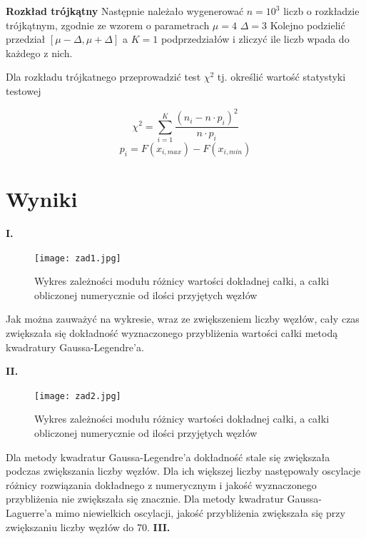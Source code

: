 \documentclass{article}
\begin{document}
\setlength{\parindent}{0pt}
\textbf{Rozkład trójkątny}
Następnie należało wygenerować $n= 10^3$
liczb o rozkładzie trójkątnym, zgodnie ze wzorem 
o parametrach $\mu=4$ $\Delta=3$
\newline
Kolejno podzielić przedział $[\mu-\Delta, \mu+\Delta]$ a $K=1$ podprzedziałów i zliczyć ile liczb wpada do każdego z nich.

\newline

Dla rozkładu trójkatnego przeprowadzić test $\chi^
2$ tj. określić wartość statystyki testowej

\begin{equation}
    \chi^2=\sum_{i=1}^K \frac{(n_i-n\cdot p_i)^2}{n\cdot p_i}
\end{equation}
\begin{equation}
    p_i=F(x_{i,max})-F(x_{i,min})
\end{equation}

\newline

\section{Wyniki}
\textbf{I.}

\begin{figure}[H]
\begin{center}
\texttt{[image: zad1.jpg]}
\caption{Wykres zależności modułu różnicy wartości dokładnej całki, a całki obliczonej numerycznie od ilości przyjętych
węzłów}
\label{pierwszy} 
\end{center}
\end{figure}

Jak można zauważyć na wykresie, wraz ze zwiększeniem liczby węzłów, cały czas
zwiększała się dokładność wyznaczonego przybliżenia wartości całki metodą
kwadratury Gaussa-Legendre’a.

\newpage
\textbf{II.}

\begin{figure}[H]
\begin{center}
\texttt{[image: zad2.jpg]}
\caption{Wykres zależności modułu różnicy wartości dokładnej całki, a całki obliczonej numerycznie od ilości przyjętych
węzłów}
\label{pierwszy} 
\end{center}
\end{figure}
\newline
Dla metody kwadratur Gaussa-Legendre’a dokładność stale się zwiększała podczas
zwiększania liczby węzłów. Dla ich większej liczby następowały oscylacje różnicy
rozwiązania dokładnego z numerycznym i jakość wyznaczonego przybliżenia nie
zwiększała się znacznie. Dla metody kwadratur Gaussa-Laguerre’a mimo niewielkich oscylacji, jakość
przybliżenia zwiększała się przy zwiększaniu liczby węzłów do 70.
\newline
\textbf{III.}
\end{document}
